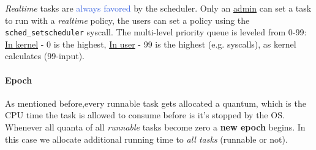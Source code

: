 \documentclass[openany,12pt]{book}
\newcommand{\code}[1]{\texttt{#1}}
\newcommand{\blue}[1]{\textcolor{RoyalBlue}{#1}}
\begin{document}
\vspace*{1em}

\textit{Realtime} tasks are \blue{always favored} by the scheduler. Only an \ul{admin} can set a task to run with a \textit{realtime} policy, the users can set a policy using the \code{sched\_setscheduler} syscall. The multi-level priority queue is leveled from 0-99: \ul{In kernel} - 0 is the highest, \ul{In user} - 99 is the highest (e.g. syscalls), as kernel calculates (99-input).




\paragraph{Epoch} As mentioned before,every runnable task gets allocated a quantum, which is the CPU time the task is allowed to consume before is it's stopped by the OS. Whenever all quanta of all \textit{runnable} tasks become zero a \textbf{new epoch} begins. In this case we allocate additional running time to \textit{all tasks} (runnable or not).
\end{document}
